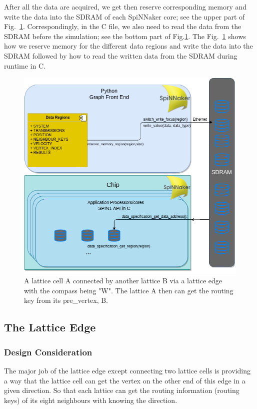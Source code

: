 After all the data are acquired, we get then reserve corresponding memory and write the data into the SDRAM of each SpiNNaker core; see the upper part of Fig.~\ref{fig:write_data}. Correspondingly, in the C file, we also need to read the data from the SDRAM before the simulation; see the bottom part of Fig.\ref{fig:write_data}. The Fig.~\ref{fig:write_data} shows how we reserve memory for the different data regions and write the data into the SDRAM followed by how to read the written data from the SDRAM during runtime in C.\\
\begin{figure}[tb]
   \centering
       \includegraphics[width=1\textwidth]{figures/write_data.png}
       \caption{A lattice cell A connected by another lattice B via a lattice edge with the compass being "W". The lattice A then can get the routing key from its pre\_vertex, B.}
       \label{fig:write_data}
\end{figure}



\subsection{The Lattice Edge} \label{sec:tle}
\subsubsection{Design Consideration}
The major job of the lattice edge except connecting two lattice cells is providing a way that the lattice cell can get the vertex on the other end of this edge in a given direction. So that each lattice can get the routing information (routing keys) of its eight neighbours with knowing the direction. \\
